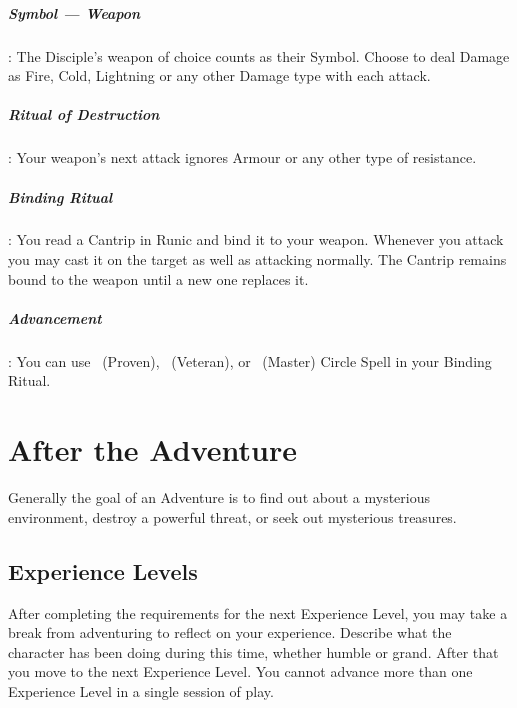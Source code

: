 \documentclass[itdr]{subfiles}
\begin{document}
\subparagraph{Symbol --- Weapon}: The Disciple's weapon of choice counts as their Symbol. Choose to deal Damage as Fire, Cold, Lightning or any other Damage type with each attack.

\subparagraph{Ritual of Destruction}: Your weapon's next attack ignores Armour or any other type of resistance.

\subparagraph{Binding Ritual}: You read a Cantrip in Runic and bind it to your weapon. Whenever you attack you may cast it on the target as well as attacking normally. The Cantrip remains bound to the weapon until a new one replaces it.

\subparagraph{Advancement}: You can use ~(Proven), ~(Veteran), or ~(Master) Circle Spell in your Binding Ritual.

\vfill


\begin{comment}

\creed{???}
{\em\begin{itemize}
\item ???
\item ???
\end{itemize}}

\subparagraph{Symbol --- ???}:

\subparagraph{??? Ritual}:

\subparagraph{??? Ritual}:

\subparagraph{Advancement}:

\end{comment}

\break

\section{After the Adventure}

Generally the goal of an Adventure is to find out about a mysterious environment, destroy a powerful threat, or seek out mysterious treasures.

\subsection{Experience Levels}
After completing the requirements for the next Experience Level, you may take a break from adventuring to reflect on your experience. Describe what the character has been doing during this time, whether humble or grand. After that you move to the next Experience Level. You cannot advance more than one Experience Level in a single session of play.
\end{document}
